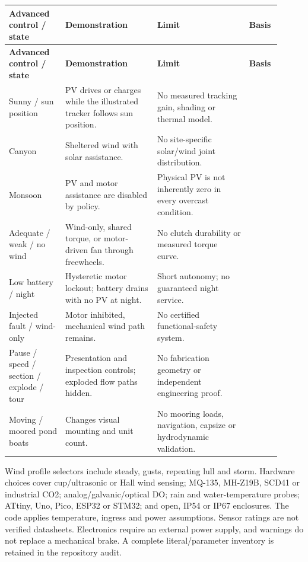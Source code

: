 \documentclass[11pt,a4paper]{article}
\begin{document}
{\small
\setlength{\tabcolsep}{3pt}\renewcommand{\arraystretch}{1.18}
\begin{longtable}{@{}>{\raggedright\arraybackslash}p{0.1963\linewidth}>{\raggedright\arraybackslash}p{0.3123\linewidth}>{\raggedright\arraybackslash}p{0.3123\linewidth}>{\raggedright\arraybackslash}p{0.0892\linewidth}@{}}
\toprule \textbf{Advanced control / state} & \textbf{Demonstration} & \textbf{Limit} & \textbf{Basis} \\ \midrule
\endfirsthead\toprule \textbf{Advanced control / state} & \textbf{Demonstration} & \textbf{Limit} & \textbf{Basis} \\ \midrule
\endhead\bottomrule\endfoot
Sunny / sun position & PV drives or charges while the illustrated tracker follows sun position. & No measured tracking gain, shading or thermal model. & [A] \cite{site} \\
Canyon & Sheltered wind with solar assistance. & No site-specific solar/wind joint distribution. & [A] \\
Monsoon & PV and motor assistance are disabled by policy. & Physical PV is not inherently zero in every overcast condition. & [A] \\
Adequate / weak / no wind & Wind-only, shared torque, or motor-driven fan through freewheels. & No clutch durability or measured torque curve. & [A] \\
Low battery / night & Hysteretic motor lockout; battery drains with no PV at night. & Short autonomy; no guaranteed night service. & [A] \\
Injected fault / wind-only & Motor inhibited, mechanical wind path remains. & No certified functional-safety system. & [A] \\
Pause / speed / section / explode / tour & Presentation and inspection controls; exploded flow paths hidden. & No fabrication geometry or independent engineering proof. & [A] \\
Moving / moored pond boats & Changes visual mounting and unit count. & No mooring loads, navigation, capsize or hydrodynamic validation. & [A] \\
\end{longtable}}
Wind profile selectors include steady, gusts, repeating lull and storm. Hardware choices cover cup/ultrasonic or Hall wind sensing; MQ-135, MH-Z19B, SCD41 or industrial CO2; analog/galvanic/optical DO; rain and water-temperature probes; ATtiny, Uno, Pico, ESP32 or STM32; and open, IP54 or IP67 enclosures. The code applies temperature, ingress and power assumptions. Sensor ratings are not verified datasheets. Electronics require an external power supply, and warnings do not replace a mechanical brake. A complete literal/parameter inventory is retained in the repository audit. \cite{site}
\end{document}
